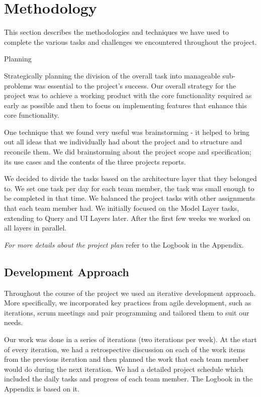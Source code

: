 \section{Methodology}\label{sec:methodology}

This section describes the methodologies and techniques we have used to complete the various tasks and challenges we encountered throughout the project.

{Planning}

Strategically planning the division of the overall task into manageable sub-problems was essential to the project’s success. Our overall strategy for the project was to achieve a working product with the core functionality required as early as possible and then to focus on implementing features that enhance this core functionality.

One technique that we found very useful was brainstorming - it helped to bring out all ideas that we individually had about the project and to structure and reconcile them. We did brainstorming about the project scope and specification; its use cases and the contents of the three projects reports.

We decided to divide the tasks based on the architecture layer that they belonged to. We set one task per day for each team member, the task was small enough to be completed in that time. We balanced the project tasks with other assignments that each team member had. We initially focused on the Model Layer tasks, extending to Query and UI Layers later. After the first few weeks we worked on all layers in parallel. 

\emph{\color{red}For more details about the project plan} refer to the Logbook in the Appendix.

\subsection{Development Approach}

Throughout the course of the project we used an iterative development approach. More specifically, we incorporated key practices from agile development, such as iterations, scrum meetings and pair programming and tailored them to suit our needs.

Our work was done in a series of iterations (two iterations per week). At the start of every iteration, we had a retrospective discussion on each of the work items from the previous iteration and then planned the work that each team member would do during the next iteration. We had a detailed project schedule which included the daily tasks and progress of each team member. The Logbook in the Appendix is based on it. 

